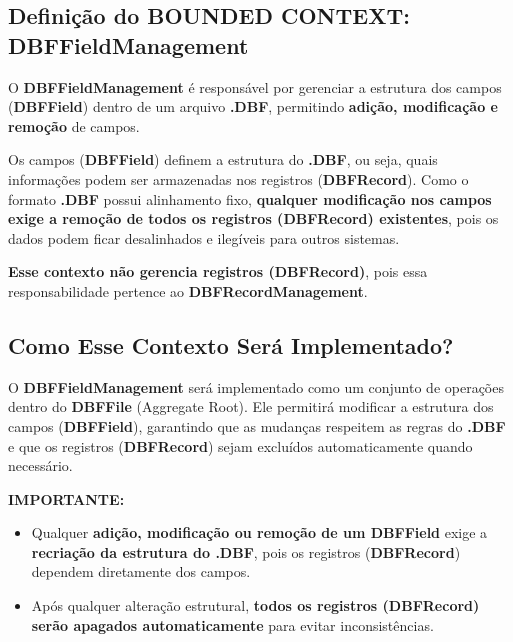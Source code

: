 \subsection{Definição do BOUNDED CONTEXT: DBFFieldManagement}
O \textbf{DBFFieldManagement} é responsável por gerenciar a estrutura dos campos (\textbf{DBFField}) dentro de um arquivo \textbf{.DBF}, permitindo \textbf{adição, modificação e remoção} de campos.

Os campos (\textbf{DBFField}) definem a estrutura do \textbf{.DBF}, ou seja, quais informações podem ser armazenadas nos registros (\textbf{DBFRecord}). Como o formato \textbf{.DBF} possui alinhamento fixo, \textbf{qualquer modificação nos campos exige a remoção de todos os registros (\textbf{DBFRecord}) existentes}, pois os dados podem ficar desalinhados e ilegíveis para outros sistemas.

\textbf{Esse contexto não gerencia registros (\textbf{DBFRecord})}, pois essa responsabilidade pertence ao \textbf{DBFRecordManagement}.

\subsection{Como Esse Contexto Será Implementado?}
O \textbf{DBFFieldManagement} será implementado como um conjunto de operações dentro do \textbf{DBFFile} (Aggregate Root). Ele permitirá modificar a estrutura dos campos (\textbf{DBFField}), garantindo que as mudanças respeitem as regras do \textbf{.DBF} e que os registros (\textbf{DBFRecord}) sejam excluídos automaticamente quando necessário.

\textbf{IMPORTANTE:} 
\begin{itemize}
    \item Qualquer \textbf{adição, modificação ou remoção de um DBFField} exige a \textbf{recriação da estrutura do .DBF}, pois os registros (\textbf{DBFRecord}) dependem diretamente dos campos.
    \item Após qualquer alteração estrutural, \textbf{todos os registros (\textbf{DBFRecord}) serão apagados automaticamente} para evitar inconsistências.
\end{itemize}

